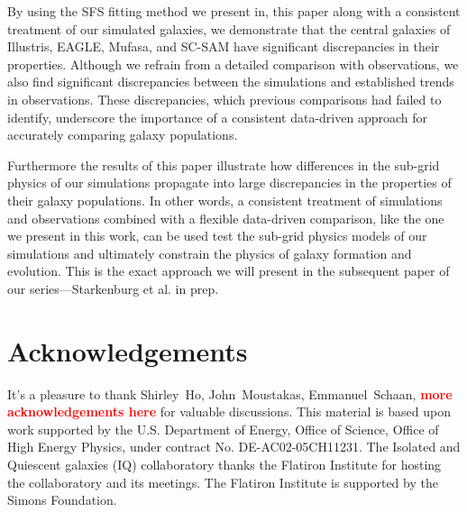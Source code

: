 \documentclass[preprint2,tighten]{aastex62}
\newcommand{\todo}[1]{{\bf \textcolor{red}{ #1}}}
\begin{document}
By using the SFS fitting method we present in, this paper along with a 
consistent treatment of our simulated galaxies, we demonstrate that the 
central galaxies of Illustris, EAGLE,  {\sc Mufasa}, and SC-SAM have significant
discrepancies in their properties. Although we refrain from a detailed 
comparison with observations, we also find significant discrepancies 
between the simulations and established trends in observations. These
discrepancies, which previous comparisons had failed to identify, underscore 
the importance of a consistent data-driven approach for accurately comparing 
galaxy populations.

Furthermore the results of this paper illustrate how differences in the 
sub-grid physics of our simulations propagate into large discrepancies 
in the properties of their galaxy populations. In other words, a 
consistent treatment of simulations and observations combined with a 
flexible data-driven comparison, like the one we present in this work, can 
be used test the sub-grid physics models of our simulations and ultimately 
constrain the physics of galaxy formation and evolution.
This is the exact approach we will present in the subsequent paper of our 
series---Starkenburg et al. in prep. %

\section*{Acknowledgements}
It's a pleasure to thank
	Shirley~Ho, 
    John~Moustakas,
	Emmanuel~Schaan, 
    \todo{more acknowledgements here} 
for valuable discussions. 
This material is based upon work supported by the U.S. Department
of Energy, Office of Science, Office of High Energy Physics, under
contract No. DE-AC02-05CH11231. The Isolated and Quiescent galaxies (IQ) 
collaboratory thanks the Flatiron Institute for hosting the collaboratory 
and its meetings. The Flatiron Institute is supported by the Simons Foundation.
\appendix
{}
\end{document}
